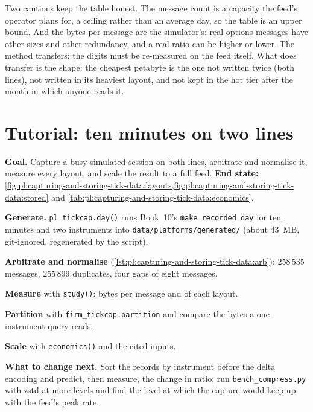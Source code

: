 Two cautions keep the table honest. The message count is a capacity the feed's operator plans for, a ceiling rather than an
average day, so the table is an upper bound. And the bytes per message are the simulator's: real options messages have other
sizes and other redundancy, and a real ratio can be higher or lower. The method transfers; the digits must be re-measured on the
feed itself. What does transfer is the shape: the cheapest petabyte is the one not written twice (both lines), not written in
its heaviest layout, and not kept in the hot tier after the month in which anyone reads it.

\section{Tutorial: ten minutes on two lines}\label{tut:pl:capturing-and-storing-tick-data:tut}

\begin{tutorial}
\textbf{Goal.} Capture a busy simulated session on both lines, arbitrate and normalise it, measure every layout, and scale the
result to a full feed. \textbf{End state:} \cref{fig:pl:capturing-and-storing-tick-data:layouts,fig:pl:capturing-and-storing-tick-data:stored}
and \cref{tab:pl:capturing-and-storing-tick-data:economics}.
\begin{tutsteps}
\item \textbf{Generate.} \texttt{pl\_tickcap.day()} runs Book~10's \texttt{make\_recorded\_day} for ten minutes and two
instruments into \texttt{data/platforms/generated/} (about 43~MB, git-ignored, regenerated by the script).
\item \textbf{Arbitrate and normalise} (\cref{lst:pl:capturing-and-storing-tick-data:arb}): 258\,535 messages, 255\,899
duplicates, four gaps of eight messages.
\item \textbf{Measure} with \texttt{study()}: bytes per message and  of each layout.
\item \textbf{Partition} with \texttt{firm\_tickcap.partition} and compare the bytes a one-instrument query reads.
\item \textbf{Scale} with \texttt{economics()} and the cited inputs.
\end{tutsteps}
\textbf{What to change next.} Sort the records by instrument before the delta encoding and predict, then measure, the change in
ratio; run \texttt{bench\_compress.py} with zstd at more levels and find the level at which the capture would keep up with the
feed's peak rate.
\end{tutorial}

